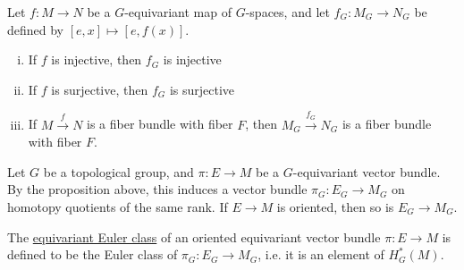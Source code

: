 \begin{prop} %
	Let $f:M\to N$ be a $G$-equivariant map of  $G$-spaces, and let
	$f_G:M_G\to N_G$ be defined by $[e,x]\mapsto [e,f(x)]$. 
	\begin{enumerate}[(i)]
	    \item If $f$ is injective, then $f_G$ is injective
		\item If $f$ is surjective, then $f_G$ is surjective
		\item If $M\xrightarrow{f} N$ is a fiber bundle with fiber $F$, then
			$M_G\xrightarrow{f_G}N_G$ is a fiber bundle with fiber  $F$. 	
	\end{enumerate}
\end{prop}

Let $G$ be a topological group, and  $\pi : E\to M$ be a  $G$-equivariant vector
bundle. By the proposition above, this induces a vector bundle  $\pi_G : E_G\to
M_G$ on homotopy quotients of the same rank. If $E\to M$ is oriented, then so is
$E_G \to M_G$. 

The \underline{equivariant Euler class} of an oriented equivariant vector bundle
$\pi : E \to M$ is defined to be the Euler class of $\pi_G : E_G \to M_G$, i.e.
it is an element of $H_G^*(M)$. 


